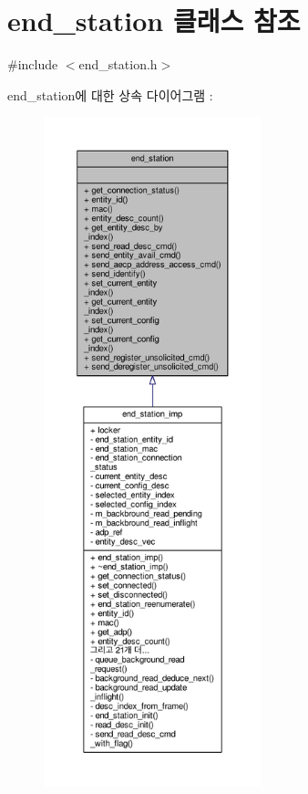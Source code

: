 \hypertarget{classavdecc__lib_1_1end__station}{}\section{end\+\_\+station 클래스 참조}
\label{classavdecc__lib_1_1end__station}


{\ttfamily \#include $<$end\+\_\+station.\+h$>$}



end\+\_\+station에 대한 상속 다이어그램 \+: 
\nopagebreak
\begin{figure}[H]
\begin{center}
\leavevmode
\includegraphics[height=550pt]{classavdecc__lib_1_1end__station__inherit__graph}
\end{center}
\end{figure}



